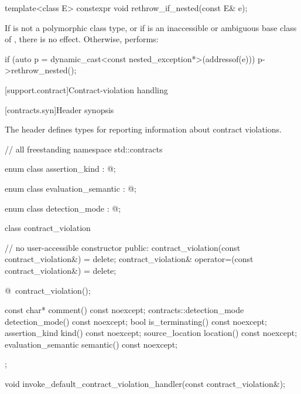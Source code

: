 %
\begin{itemdecl}
template<class E> constexpr void rethrow_if_nested(const E& e);
\end{itemdecl}

\begin{itemdescr}
\pnum
\effects
If  is not a polymorphic class type, or
if  is an inaccessible or ambiguous base class of ,
there is no effect.
Otherwise, performs:
\begin{codeblock}
if (auto p = dynamic_cast<const nested_exception*>(addressof(e)))
  p->rethrow_nested();
\end{codeblock}
\end{itemdescr}

[support.contract]{Contract-violation handling}

[contracts.syn]{Header  synopsis}

\pnum
The header  defines types
for reporting information about contract violations.

%
\begin{codeblock}
// all freestanding
namespace std::contracts {

  enum class assertion_kind : @;

  enum class evaluation_semantic : @;

  enum class detection_mode : @;

  class contract_violation {
    // no user-accessible constructor
  public:
    contract_violation(const contract_violation&) = delete;
    contract_violation& operator=(const contract_violation&) = delete;

    @\seebelow@ ~contract_violation();

    const char* comment() const noexcept;
    contracts::detection_mode detection_mode() const noexcept;
    bool is_terminating() const noexcept;
    assertion_kind kind() const noexcept;
    source_location location() const noexcept;
    evaluation_semantic semantic() const noexcept;
  };

  void invoke_default_contract_violation_handler(const contract_violation&);
}
\end{codeblock}

